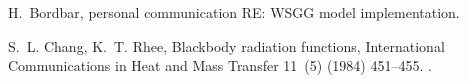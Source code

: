 \documentclass[preprint,12pt]{elsarticle}
\begin{document}
\begin{thebibliography}{10}
H.~Bordbar, {personal communication RE: WSGG model implementation}.

S.~L. Chang, K.~T. Rhee, {Blackbody radiation functions}, {International
Communications in Heat and Mass Transfer} 11~(5) (1984) 451--455.
\newblock \href {http://dx.doi.org/10.1016/0735-1933(84)90051-4}
  {}.

\end{thebibliography}

\end{document}
